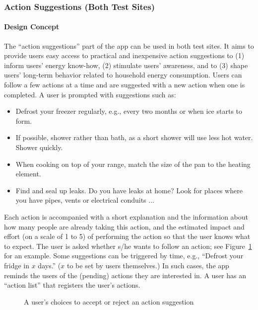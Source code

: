 \subsubsection{Action Suggestions (Both Test Sites)}
\label{sect:tips}

\paragraph{Design Concept}

The ``action suggestions'' part of the app can be used in both test sites. 
It aims to provide users easy access to practical and inexpensive action suggestions to (1) inform users' energy know-how, (2) stimulate users' awareness, and to (3) shape users' long-term behavior related to household energy consumption. Users can follow a few actions at a time and are suggested with a new action when one is completed. A user is prompted with suggestions such as: 
\begin{itemize}
	\item Defrost your freezer regularly, e.g., every two months or when ice starts to form. 
	\item If possible, shower rather than bath, as a short shower will use less hot water. Shower quickly. 
	\item When cooking on top of your range, match the size of the pan to the heating element.
	\item Find and seal up leaks. Do you have leaks at home? Look for places where you have pipes, vents or electrical conduits ... 
\end{itemize}

Each action is accompanied with a short explanation and the information about how many people are already taking this action, and the estimated impact and effort (on a scale of 1 to 5) of performing the action so that the user knows what to expect. The user is asked whether s/he wants to follow an action; see Figure~\ref{fig:action_choice} for an example. 
%
% 
Some suggestions can be triggered by time, e.g., ``Defrost your fridge in $x$ days.'' ($x$ to be set by users themselves.) In such cases, the app reminds the users of the (pending) actions they are interested in. 
A user has an ``action list'' that registers the user's actions. 

\begin{figure}
\begin{center}
	   	 \caption{A user's choices to accept or reject an action suggestion}\label{fig:action_choice}
\end{center}
\end{figure} 

